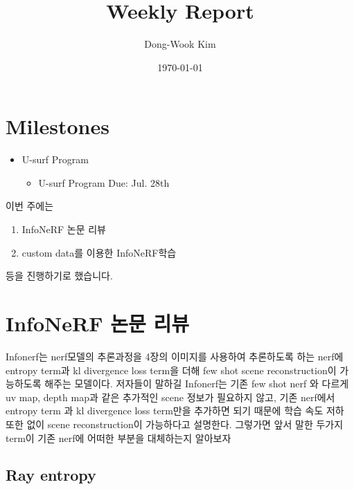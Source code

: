 \documentclass{vipweekly}
\title{Weekly Report} %
\author{Dong-Wook Kim} %
\date{\today} %
\begin{document}
\maketitle
\hypersetup{citecolor=blue}

\section*{Milestones}
\begin{itemize} 
    \item U-surf Program \\
    \begin{itemize}
        \item U-surf Program Due: Jul. 28th\\
    \end{itemize}
\end{itemize}
이번 주에는 
\begin{enumerate}
    \item InfoNeRF\cite{Infonerf} 논문 리뷰
    \item custom data를 이용한 InfoNeRF학습
    
\end{enumerate} 
등을 진행하기로 했습니다.


\section{InfoNeRF\cite{Infonerf} 논문 리뷰}

Infonerf는 nerf모델의 추론과정을 4장의 이미지를 사용하여 추론하도록 하는 nerf에 entropy term과 
kl divergence loss term을 더해 few shot scene reconstruction이 가능하도록 해주는 모델이다.
저자들이 말하길 Infonerf는 기존 few shot nerf 와 다르게 uv map, 
depth map과 같은 추가적인 scene 정보가 필요하지 않고, 기존 nerf에서 
entropy term 과 kl divergence loss term만을 추가하면 되기 때문에 학습 속도 
저하 또한 없이 scene reconstruction이 가능하다고 설명한다.
그렇가면 앞서 말한 두가지 term이 기존 nerf에 어떠한 부분을 대체하는지 알아보자

\subsection{Ray entropy}
\end{document}
